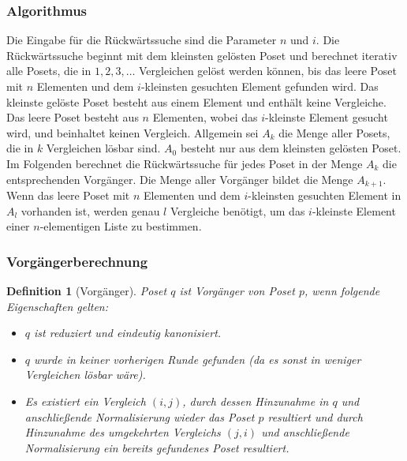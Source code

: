 \documentclass[10pt,journal,compsoc]{IEEEtran}
\newtheorem{definition}{Definition}
\begin{document}
\subsubsection{Algorithmus} \label{sec:backward:algorithm}

Die Eingabe für die Rückwärtssuche sind die Parameter $n$ und $i$.
Die Rückwärtssuche beginnt mit dem kleinsten gelösten Poset und berechnet iterativ alle Posets, die in $1, 2, 3, \dots$ Vergleichen gelöst werden können, bis das leere Poset mit $n$ Elementen und dem $i$-kleinsten gesuchten Element gefunden wird.
Das kleinste gelöste Poset besteht aus einem Element und enthält keine Vergleiche.
Das leere Poset besteht aus $n$ Elementen, wobei das $i$-kleinste Element gesucht wird, und beinhaltet keinen Vergleich.
Allgemein sei $A_k$ die Menge aller Posets, die in $k$ Vergleichen lösbar sind.
$A_0$ besteht nur aus dem kleinsten gelösten Poset.
Im Folgenden berechnet die Rückwärtssuche für jedes Poset in der Menge $A_k$ die entsprechenden Vorgänger.
Die Menge aller Vorgänger bildet die Menge $A_{k + 1}$.
Wenn das leere Poset mit $n$ Elementen und dem $i$-kleinsten gesuchten Element in $A_l$ vorhanden ist, werden genau $l$ Vergleiche benötigt, um das $i$-kleinste Element einer $n$-elementigen Liste zu bestimmen.

\subsubsection{Vorgängerberechnung} \label{sec:backward:predecessor_calculation}

\begin{definition}[Vorgänger] \label{definition:predecessor_calculation}
  Poset $q$ ist Vorgänger von Poset $p$, wenn folgende Eigenschaften gelten:
  \begin{itemize}
    \item $q$ ist reduziert und eindeutig kanonisiert.
    \item $q$ wurde in keiner vorherigen Runde gefunden (da es sonst in weniger Vergleichen lösbar wäre).
    \item Es existiert ein Vergleich $(i, j)$, durch dessen Hinzunahme in $q$ und anschließende Normalisierung wieder das Poset $p$ resultiert und durch Hinzunahme des umgekehrten Vergleichs $(j, i)$ und anschließende Normalisierung ein bereits gefundenes Poset resultiert.
  \end{itemize}
\end{definition}
\end{document}
